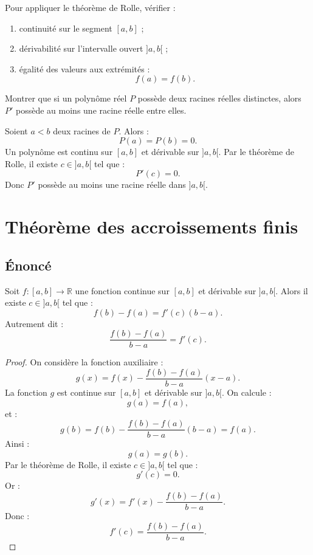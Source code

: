 \documentclass[11pt,a4paper]{article}
\newcommand{\R}{\mathbb R}
\begin{document}
\begin{methodbox}
Pour appliquer le théorème de Rolle, vérifier :
\begin{enumerate}
    \item continuité sur le segment \([a,b]\) ;
    \item dérivabilité sur l'intervalle ouvert \(]a,b[\) ;
    \item égalité des valeurs aux extrémités :
    \[
    f(a)=f(b).
    \]
\end{enumerate}
\end{methodbox}

\begin{exercicebox}
Montrer que si un polynôme réel \(P\) possède deux racines réelles distinctes, alors \(P'\) possède au moins une racine réelle entre elles.
\end{exercicebox}

\begin{correctionbox}
Soient \(a<b\) deux racines de \(P\).  
Alors :
\[
P(a)=P(b)=0.
\]
Un polynôme est continu sur \([a,b]\) et dérivable sur \(]a,b[\).  
Par le théorème de Rolle, il existe \(c\in]a,b[\) tel que :
\[
P'(c)=0.
\]
Donc \(P'\) possède au moins une racine réelle dans \(]a,b[\).
\end{correctionbox}

\section{Théorème des accroissements finis}

\subsection{Énoncé}

\begin{theorembox}
Soit \(f:[a,b]\to\R\) une fonction continue sur \([a,b]\) et dérivable sur \(]a,b[\).  
Alors il existe \(c\in]a,b[\) tel que :
\[
f(b)-f(a)=f'(c)(b-a).
\]
Autrement dit :
\[
\frac{f(b)-f(a)}{b-a}=f'(c).
\]
\end{theorembox}

\begin{proof}
On considère la fonction auxiliaire :
\[
g(x)=f(x)-\frac{f(b)-f(a)}{b-a}(x-a).
\]
La fonction \(g\) est continue sur \([a,b]\) et dérivable sur \(]a,b[\).  
On calcule :
\[
g(a)=f(a),
\]
et :
\[
g(b)=f(b)-\frac{f(b)-f(a)}{b-a}(b-a)=f(a).
\]
Ainsi :
\[
g(a)=g(b).
\]
Par le théorème de Rolle, il existe \(c\in]a,b[\) tel que :
\[
g'(c)=0.
\]
Or :
\[
g'(x)=f'(x)-\frac{f(b)-f(a)}{b-a}.
\]
Donc :
\[
f'(c)=\frac{f(b)-f(a)}{b-a}.
\]
\end{proof}
\end{document}
